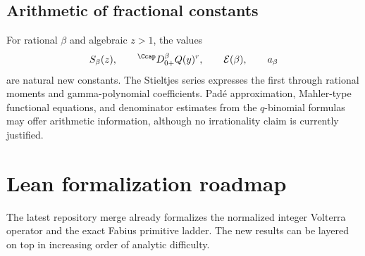 \documentclass[11pt,oneside]{article}
\theoremstyle{definition}
\theoremstyle{remark}
\newcommand{\1}{\mathbf 1}
\begin{document}
\subsection{Arithmetic of fractional constants}

For rational $\beta$ and algebraic $z>1$, the values
\begin{equation}
 S_\beta(z),
 \qquad
 {}^{\Ccap}D_{0+}^\beta Q(y)^r,
 \qquad
 \mathcal E(\beta),
 \qquad
 a_\beta
 \label{p9:eq:fractional-constants}
\end{equation}
are natural new constants.  The Stieltjes series expresses the first through
rational moments and gamma-polynomial coefficients.  Pad\'e approximation,
Mahler-type functional equations, and denominator estimates from the
$q$-binomial formulas may offer arithmetic information, although no
irrationality claim is currently justified.

\section{Lean formalization roadmap}
\label{p9:sec:Lean}

The latest repository merge already formalizes the normalized integer
Volterra operator and the exact Fabius primitive ladder.  The new results can
be layered on top in increasing order of analytic difficulty.
\end{document}
